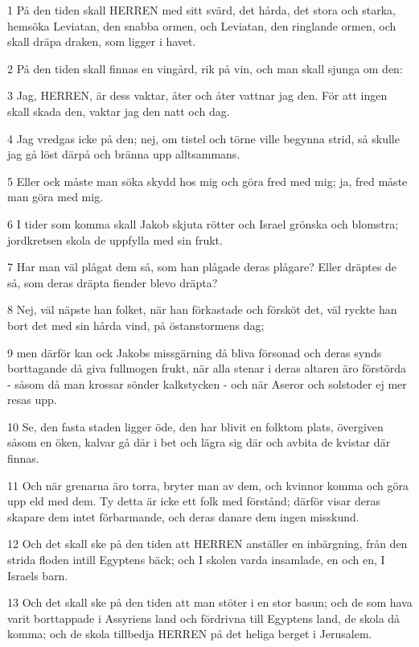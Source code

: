\par 1 På den tiden skall HERREN med sitt svärd, det hårda, det stora och starka, hemsöka Leviatan, den snabba ormen, och Leviatan, den ringlande ormen, och skall dräpa draken, som ligger i havet.
\par 2 På den tiden skall finnas en vingård, rik på vin, och man skall sjunga om den:
\par 3 Jag, HERREN, är dess vaktar, åter och åter vattnar jag den. För att ingen skall skada den, vaktar jag den natt och dag.
\par 4 Jag vredgas icke på den; nej, om tistel och törne ville begynna strid, så skulle jag gå löst därpå och bränna upp alltsammans.
\par 5 Eller ock måste man söka skydd hos mig och göra fred med mig; ja, fred måste man göra med mig.
\par 6 I tider som komma skall Jakob skjuta rötter och Israel grönska och blomstra; jordkretsen skola de uppfylla med sin frukt.
\par 7 Har man väl plågat dem så, som han plågade deras plågare? Eller dräptes de så, som deras dräpta fiender blevo dräpta?
\par 8 Nej, väl näpste han folket, när han förkastade och försköt det, väl ryckte han bort det med sin hårda vind, på östanstormens dag;
\par 9 men därför kan ock Jakobs missgärning då bliva försonad och deras synds borttagande då giva fullmogen frukt, när alla stenar i deras altaren äro förstörda - såsom då man krossar sönder kalkstycken - och när Aseror och solstoder ej mer resas upp.
\par 10 Se, den fasta staden ligger öde, den har blivit en folktom plats, övergiven såsom en öken, kalvar gå där i bet och lägra sig där och avbita de kvistar där finnas.
\par 11 Och när grenarna äro torra, bryter man av dem, och kvinnor komma och göra upp eld med dem. Ty detta är icke ett folk med förstånd; därför visar deras skapare dem intet förbarmande, och deras danare dem ingen misskund.
\par 12 Och det skall ske på den tiden att HERREN anställer en inbärgning, från den strida floden intill Egyptens bäck; och I skolen varda insamlade, en och en, I Israels barn.
\par 13 Och det skall ske på den tiden att man stöter i en stor basun; och de som hava varit borttappade i Assyriens land och fördrivna till Egyptens land, de skola då komma; och de skola tillbedja HERREN på det heliga berget i Jerusalem.


